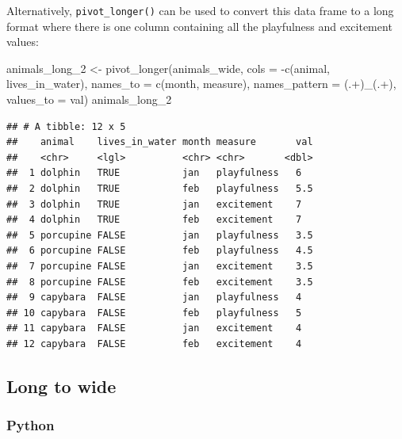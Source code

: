 \documentclass[
]{book}
\newenvironment{Shaded}{\begin{snugshade}}{\end{snugshade}}
\newcommand{\AttributeTok}[1]{\textcolor[rgb]{0.77,0.63,0.00}{#1}}
\newcommand{\FunctionTok}[1]{\textcolor[rgb]{0.00,0.00,0.00}{#1}}
\newcommand{\NormalTok}[1]{#1}
\newcommand{\OtherTok}[1]{\textcolor[rgb]{0.56,0.35,0.01}{#1}}
\newcommand{\SpecialCharTok}[1]{\textcolor[rgb]{0.00,0.00,0.00}{#1}}
\newcommand{\StringTok}[1]{\textcolor[rgb]{0.31,0.60,0.02}{#1}}
\begin{document}
Alternatively, \texttt{pivot\_longer()} can be used to convert this data frame to a long format where there is one column containing all the playfulness and excitement values:

\begin{Shaded}
\begin{Highlighting}[]
\NormalTok{animals\_long\_2 }\OtherTok{\textless{}{-}} \FunctionTok{pivot\_longer}\NormalTok{(animals\_wide,}
                               \AttributeTok{cols =} \SpecialCharTok{{-}}\FunctionTok{c}\NormalTok{(}\StringTok{\textquotesingle{}animal\textquotesingle{}}\NormalTok{, }\StringTok{\textquotesingle{}lives\_in\_water\textquotesingle{}}\NormalTok{),}
                               \AttributeTok{names\_to =} \FunctionTok{c}\NormalTok{(}\StringTok{\textquotesingle{}month\textquotesingle{}}\NormalTok{, }\StringTok{\textquotesingle{}measure\textquotesingle{}}\NormalTok{),}
                               \AttributeTok{names\_pattern =} \StringTok{\textquotesingle{}(.+)\_(.+)\textquotesingle{}}\NormalTok{,}
                               \AttributeTok{values\_to =} \StringTok{\textquotesingle{}val\textquotesingle{}}\NormalTok{)}
\NormalTok{animals\_long\_2}
\end{Highlighting}
\end{Shaded}

\begin{verbatim}
## # A tibble: 12 x 5
##    animal    lives_in_water month measure       val
##    <chr>     <lgl>          <chr> <chr>       <dbl>
##  1 dolphin   TRUE           jan   playfulness   6  
##  2 dolphin   TRUE           feb   playfulness   5.5
##  3 dolphin   TRUE           jan   excitement    7  
##  4 dolphin   TRUE           feb   excitement    7  
##  5 porcupine FALSE          jan   playfulness   3.5
##  6 porcupine FALSE          feb   playfulness   4.5
##  7 porcupine FALSE          jan   excitement    3.5
##  8 porcupine FALSE          feb   excitement    3.5
##  9 capybara  FALSE          jan   playfulness   4  
## 10 capybara  FALSE          feb   playfulness   5  
## 11 capybara  FALSE          jan   excitement    4  
## 12 capybara  FALSE          feb   excitement    4
\end{verbatim}

\hypertarget{long-to-wide}{%
\subsection{Long to wide}\label{long-to-wide}}

\hypertarget{python-33}{%
\subsubsection*{Python}\label{python-33}}
\end{document}
